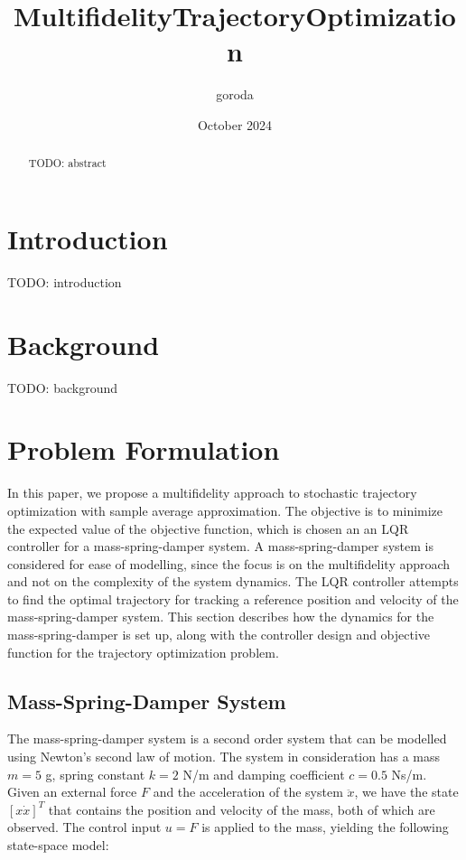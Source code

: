 \documentclass{article}
\title{MultifidelityTrajectoryOptimization}
\author{goroda }
\date{October 2024}
\begin{document}
\maketitle

\begin{abstract}
  TODO: abstract
\end{abstract}

\section{Introduction}
TODO: introduction
\section{Background}
TODO: background

\section{Problem Formulation}
In this paper, we propose a multifidelity approach to stochastic trajectory optimization with sample average approximation.
The objective is to minimize the expected value of the objective function, which is chosen an an LQR controller for a mass-spring-damper system.
A mass-spring-damper system is considered for ease of modelling, since the focus is on the multifidelity approach
and not on the complexity of the system dynamics.
The LQR controller attempts to find the optimal trajectory for tracking a reference position and velocity of the mass-spring-damper system.
This section describes how the dynamics for the mass-spring-damper is set up, along with the controller design and objective function for the trajectory optimization problem.

\subsection{Mass-Spring-Damper System}
The mass-spring-damper system is a second order system that can be modelled using Newton's second law of motion.
The system in consideration has a mass $m=5$ g, spring constant $k=2$ N/m and damping coefficient $c=0.5$ Ns/m.
Given an external force $F$ and the acceleration of the system $\ddot{x}$, we have the state $[x \dot{x}]^T$
that contains the position and velocity of the mass, both of which are observed.
The control input $u=F$ is applied to the mass, yielding the following state-space model:
\end{document}
